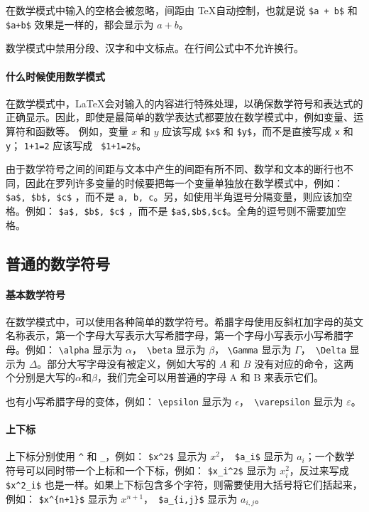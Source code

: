 在数学模式中输入的空格会被忽略，间距由 \TeX 自动控制，也就是说 \verb|$a + b$| 和 \verb| $a+b$| 效果是一样的，都会显示为 \(a+b\)。

数学模式中禁用分段、汉字和中文标点。在行间公式中不允许换行。

\paragraph{什么时候使用数学模式}
在数学模式中，\LaTeX 会对输入的内容进行特殊处理，以确保数学符号和表达式的正确显示。因此，即使是最简单的数学表达式都要放在数学模式中，例如变量、运算符和函数等。 例如，变量 \(x\) 和 \(y\) 应该写成 \verb|$x$| 和 \verb|$y$|，而不是直接写成 \verb|x| 和 \verb|y|； \verb|1+1=2| 应该写成 \verb| $1+1=2$|。

由于数学符号之间的间距与文本中产生的间距有所不同、数学和文本的断行也不同，因此在罗列许多变量的时候要把每一个变量单独放在数学模式中，例如： \verb|$a$, $b$, $c$| ，而不是 \verb|a, b, c|。另，如使用半角逗号分隔变量，则应该加空格。例如： \verb|$a$, $b$, $c$| ，而不是 \verb|$a$,$b$,$c$|。全角的逗号则不需要加空格。

\subsection{普通的数学符号}
\paragraph{基本数学符号}
在数学模式中，可以使用各种简单的数学符号。希腊字母使用反斜杠加字母的英文名称表示，第一个字母大写表示大写希腊字母，第一个字母小写表示小写希腊字母。例如： \verb|\alpha| 显示为 \(\alpha\)，\verb| \beta| 显示为 \(\beta\)， \verb|\Gamma| 显示为 \(\Gamma\)，\verb| \Delta| 显示为 \(\Delta\)。部分大写字母没有被定义，例如大写的 $A$ 和 $B$ 没有对应的命令，这两个分别是大写的\(\alpha\)和\(\beta\)，我们完全可以用普通的字母 A 和 B 来表示它们。

也有小写希腊字母的变体，例如： \verb|\epsilon| 显示为 \(\epsilon\)，\verb| \varepsilon| 显示为 \(\varepsilon\)。

\paragraph{上下标}
上下标分别使用 \verb|^| 和 \verb|_|，例如： \verb|$x^2$| 显示为 \(x^2\)，\verb| $a_i$| 显示为 \(a_i\)；一个数学符号可以同时带一个上标和一个下标，例如： \verb|$x_i^2$| 显示为 \(x_i^2\)，反过来写成 \verb| $x^2_i$| 也是一样。如果上下标包含多个字符，则需要使用大括号将它们括起来，例如： \verb|$x^{n+1}$| 显示为 \(x^{n+1}\)，\verb| $a_{i,j}$| 显示为 \(a_{i,j}\)。

